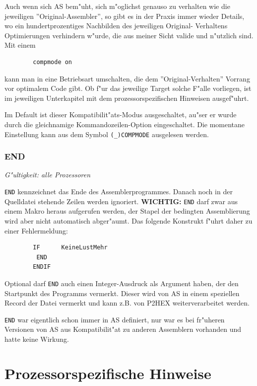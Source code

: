 \documentclass[12pt,a4paper,twoside]{report}
\makeatletter
\newcommand{\bb}[1]{{\bf #1}}
\newcommand{\tty}[1]{{\tt #1}}
\newcommand{\ttindex}[1]{\index{#1@{\tt #1}}}
\newcommand{\asname}{AS}
\newcommand{\predefsym}[1]{{\tt (\_)#1}}
\makeatother
\begin{document}
Auch wenn sich \asname{} bem"uht, sich m"oglichst genauso zu verhalten wie die
jeweiligen ''Original-Assembler'', so gibt es in der Praxis immer wieder
Details, wo ein hundertprozentiges Nachbilden des jeweiligen Original-
Verhaltens Optimierungen verhindern w"urde, die aus meiner Sicht valide
und n"utzlich sind.  Mit einem
\begin{verbatim}
        compmode on
\end{verbatim}
kann man in eine Betriebsart umschalten, die dem ''Original-Verhalten''
Vorrang vor optimalem Code gibt.  Ob f"ur das jeweilige Target solche
F"alle vorliegen, ist im jeweiligen Unterkapitel mit dem prozessorspezifischen
Hinweisen ausgef"uhrt.
\par
Im Default ist dieser Kompatibilit"ats-Modus ausgeschaltet, au"ser er
wurde durch die gleichnamige Kommandozeilen-Option eingeschaltet. Die
momentane Einstellung kann aus dem Symbol \predefsym{COMPMODE} ausgelesen
werden.


\subsection{END}
\ttindex{END}

{\em G"ultigkeit: alle Prozessoren}

\tty{END} kennzeichnet das Ende des Assemblerprogrammes.  Danach
noch in der Quelldatei stehende Zeilen werden ignoriert.
\bb{WICHTIG:} \tty{END} darf zwar aus einem Makro heraus aufgerufen
werden, der Stapel der bedingten Assemblierung wird aber nicht
automatisch abger"aumt.  Das folgende Konstrukt f"uhrt daher zu
einer Fehlermeldung:
\begin{verbatim}
        IF      KeineLustMehr
         END
        ENDIF
\end{verbatim}
Optional darf \tty{END} auch einen Integer-Ausdruck als Argument haben,
der den Startpunkt des Programms vermerkt.  Dieser wird von \asname{} in einem
speziellen Record der Datei vermerkt und kann z.B. von P2HEX
weiterverarbeitet werden.
\par
\tty{END} war eigentlich schon immer in \asname{} definiert, nur war es
bei fr"uheren Versionen von \asname{} aus Kompatibilit"at zu anderen
Assemblern vorhanden und hatte keine Wirkung.


\cleardoublepage
\chapter{Prozessorspezifische Hinweise}
\end{document}
